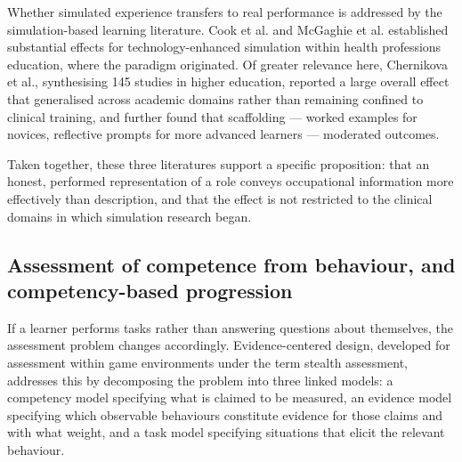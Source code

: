 Whether simulated experience transfers to real performance is addressed by the simulation-\allowbreak{}based learning literature. Cook et al.\cite{r17} and McGaghie et al.\cite{r18} established substantial effects for technology-\allowbreak{}enhanced simulation within health professions education, where the paradigm originated. Of greater relevance here, Chernikova et al.\cite{r19}, synthesising 145 studies in higher education, reported a large overall effect that generalised across academic domains rather than remaining confined to clinical training, and further found that scaffolding --- worked examples for novices, reflective prompts for more advanced learners --- moderated outcomes.

Taken together, these three literatures support a specific proposition: that an honest, performed representation of a role conveys occupational information more effectively than description, and that the effect is not restricted to the clinical domains in which simulation research began.

\subsection{Assessment of competence from behaviour, and competency-\allowbreak{}based progression}

If a learner performs tasks rather than answering questions about themselves, the assessment problem changes accordingly. Evidence-\allowbreak{}centered design, developed for assessment within game environments under the term stealth assessment\cite{r20}, addresses this by decomposing the problem into three linked models: a competency model specifying what is claimed to be measured, an evidence model specifying which observable behaviours constitute evidence for those claims and with what weight, and a task model specifying situations that elicit the relevant behaviour.

